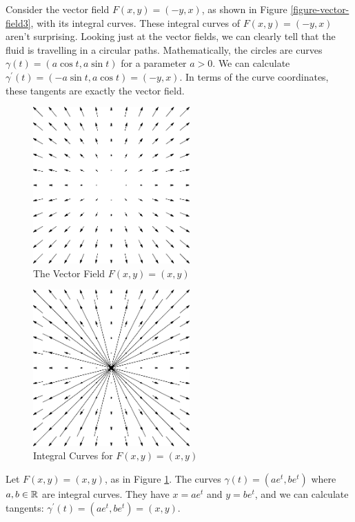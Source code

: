 \documentclass[fleqn,letterpaper]{report}
\begin{document}
\begin{example}
Consider the vector field $F(x,y) = (-y,x)$, as shown in
Figure \ref{figure-vector-field3}, with its integral curves.
These integral curves of $F(x,y) = (-y,x)$ aren't surprising.
Looking just at the vector fields, we can clearly
tell that the fluid is travelling in a circular paths.
Mathematically, the circles are curves $\gamma(t) = (a \cos t,
a \sin t)$ for a parameter $a > 0$. We can calculate
$\gamma^\prime(t) = (-a\sin t, a \cos t) = (-y, x)$. In terms
of the curve coordinates, these tangents are exactly the
vector field.
\end{example}

\begin{figure}[t]
\centering
\includegraphics[width=6cm]{figure04.eps}
\caption{The Vector Field $F(x,y) = (x,y)$}
\label{figure-vector-field4}
\end{figure}

\begin{figure}[t]
\centering
\includegraphics[width=6cm]{figure05.eps}
\caption{Integral Curves for $F(x,y) = (x,y)$}
\label{figure-vector-field4-curves}
\end{figure}

\begin{example}
Let $F(x,y) = (x,y)$, as in Figure \ref{figure-vector-field4}.
The curves $\gamma(t) = (ae^t,be^t)$ where $a,b \in \mathbb{R}$ are
integral curves. They have $x = ae^t$ and $y = be^t$, and we
can calculate tangents: $\gamma^\prime(t) = (ae^t, be^t) =
(x,y)$. 
\end{example}
\end{document}

